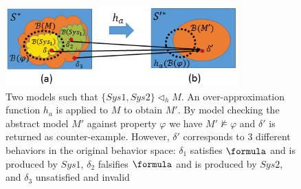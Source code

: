 \begin{figure}[!t]
		\centering
		\includegraphics[width=0.8\textwidth]{figs/distinction.png}
		\caption{\small Two models such that $\{Sys1,Sys2\}\triangleleft_h M$. An over-approximation function $h_a$ is applied to $M$ to obtain $M'$. By model checking the abstract model $M'$ against property $\varphi$ we have $M'\not\models\varphi$ and $\delta'$ is returned as counter-example. However, $\delta'$ corresponds to 3 different behaviors in the original behavior space: $\delta_1$ satisfies $\formula$ and is produced by $Sys1$, $\delta_2$ falsifies $\formula$ and is produced by $Sys2$, and $\delta_3$ unsatisfied and invalid}
		\label{fig:ambiguity}
\end{figure}


